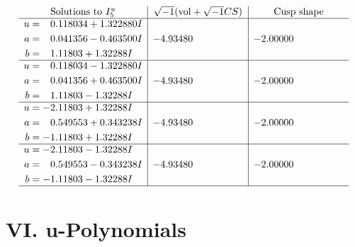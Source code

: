 \documentclass[1p]{elsarticle_modified}
\theoremstyle{definition}
\newcommand{\I}{\sqrt{-1}}
\begin{document}
$$\begin{array}{c|c|c}  
\text{Solutions to }I^u_{5}& \I (\text{vol} + \sqrt{-1}CS) & \text{Cusp shape}\\
 \hline 
\begin{aligned}
u &= \phantom{-}0.118034 + 1.322880 I \\
a &= \phantom{-}0.041356 - 0.463500 I \\
b &= \phantom{-}1.11803 + 1.32288 I\end{aligned}
 & -4.93480\phantom{ +0.000000I} & -2.00000\phantom{ +0.000000I} \\ \hline\begin{aligned}
u &= \phantom{-}0.118034 - 1.322880 I \\
a &= \phantom{-}0.041356 + 0.463500 I \\
b &= \phantom{-}1.11803 - 1.32288 I\end{aligned}
 & -4.93480\phantom{ +0.000000I} & -2.00000\phantom{ +0.000000I} \\ \hline\begin{aligned}
u &= -2.11803 + 1.32288 I \\
a &= \phantom{-}0.549553 + 0.343238 I \\
b &= -1.11803 + 1.32288 I\end{aligned}
 & -4.93480\phantom{ +0.000000I} & -2.00000\phantom{ +0.000000I} \\ \hline\begin{aligned}
u &= -2.11803 - 1.32288 I \\
a &= \phantom{-}0.549553 - 0.343238 I \\
b &= -1.11803 - 1.32288 I\end{aligned}
 & -4.93480\phantom{ +0.000000I} & -2.00000\phantom{ +0.000000I}\\
 \hline 
 \end{array}$$\newpage
\newpage\renewcommand{\arraystretch}{1}
\centering \section*{ VI. u-Polynomials}
\end{document}
